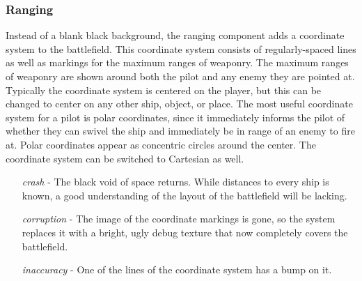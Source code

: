 \documentclass[a4paper]{article}
\begin{document}
\vspace{-0.5cm} \hspace{-18pt} \subsubsection{Ranging} \label{fighter_ranging} \vspace{-0.2cm}
Instead of a blank black background, the ranging component adds a coordinate system to the battlefield. This coordinate system consists of regularly-spaced lines as well as markings for the maximum ranges of weaponry. The maximum ranges of weaponry are shown around both the pilot and any enemy they are pointed at. Typically the coordinate system is centered on the player, but this can be changed to center on any other ship, object, or place. The most useful coordinate system for a pilot is polar coordinates, since it immediately informs the pilot of whether they can swivel the ship and immediately be in range of an enemy to fire at. Polar coordinates appear as concentric circles around the center. The coordinate system can be switched to Cartesian as well.
\begin{enumerate}[leftmargin=2cm]
\item [\textit{crash}] - The black void of space returns. While distances to every ship is known, a good understanding of the layout of the battlefield will be lacking.
\item [\textit{corruption}] - The image of the coordinate markings is gone, so the system replaces it with a bright, ugly debug texture that now completely covers the battlefield. 
\item [\textit{inaccuracy}] - One of the lines of the coordinate system has a bump on it.
\end{enumerate}
\end{document}
